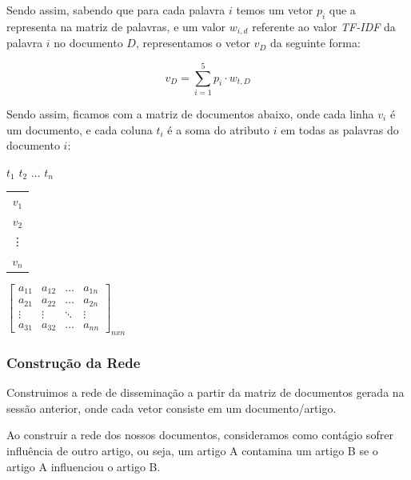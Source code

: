 \documentclass[a4paper,12pt]{article}
\begin{document}
Sendo assim, sabendo que para cada palavra $i$ temos um vetor $p_{i}$ que a representa na matriz de palavras, e um valor $w_{i,d}$ referente
ao valor \textit{TF-IDF} da palavra $i$ no documento $D$, representamos o vetor $v_{D}$ da seguinte forma:

\begin{equation}
  v_{D} = \sum_{i=1}^{5} p_{i} \cdot w_{t,D}
\end{equation}


Sendo assim, ficamos com a matriz de documentos abaixo, onde cada linha $v_{i}$ é um documento, e cada coluna $t_{i}$ é a soma do atributo $i$
em todas as palavras do documento $i$:

 \begin{center}
 \hspace{0.2cm}$t_{1}$ \hspace{0.5cm} $t_{2}$ \hspace{0.3cm} $\hdots$ \hspace{0.4cm}$t_{n}$
 
 \vspace{0.2cm}
 
\begin{tabular}{c}
   $v_{1}$ \\
   $v_{2}$ \\
   \vdots\\
   $v_{n}$
 \end{tabular}
 $
 \begin{bmatrix}
  a_{11} & a_{12} & \hdots & a_{1n}\\
  a_{21} & a_{22} & \hdots & a_{2n}\\
  \vdots & \vdots & \ddots & \vdots\\
  a_{31} & a_{32} & \hdots & a_{nn}
 \end{bmatrix}_{nxn}
$

\end{center}



\subsubsection{Construção da Rede}

 Construimos a rede de disseminação a partir da matriz de documentos gerada na sessão anterior, onde cada vetor consiste em um documento/artigo.
 
 Ao construir a rede dos nossos documentos,
 consideramos como contágio sofrer influência de outro artigo, ou seja, um artigo A contamina um artigo B se o artigo A influenciou o
 artigo B.
 
\end{document}
